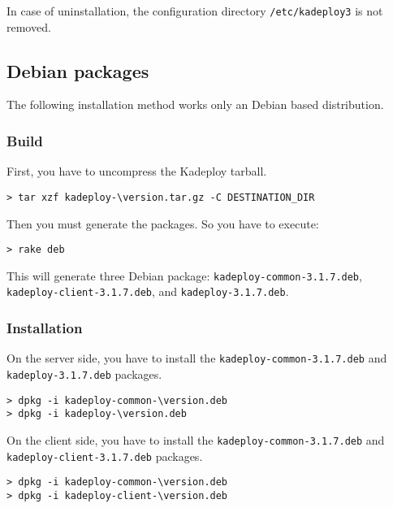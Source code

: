 \documentclass[a4wide,10pt,oneside]{book}
\newcommand{\version}{3.1.7}
\begin{document}
\noindent In case of uninstallation, the configuration directory \texttt{/etc/kadeploy3} is not removed.

\subsection{Debian packages}
The following installation method works only an Debian based distribution.
\subsubsection{Build}
\noindent First, you have to uncompress the Kadeploy tarball.
\begin{small}
\begin{Verbatim}[commandchars=\\\{\}]
> tar xzf kadeploy-\version.tar.gz -C DESTINATION_DIR
\end{Verbatim}
\end{small}

\noindent Then you must generate the packages. So you have to execute:
\begin{small}
\begin{verbatim}
> rake deb
\end{verbatim}
\end{small}
This will generate three Debian package: \texttt{kadeploy-common-\version.deb}, \texttt{kadeploy-client-\version.deb}, and \texttt{kadeploy-\version.deb}.
\subsubsection{Installation}
\noindent On the server side, you have to install the \texttt{kadeploy-common-\version.deb} and \texttt{kadeploy-\version.deb} packages.
\begin{small}
\begin{Verbatim}[commandchars=\\\{\}]
> dpkg -i kadeploy-common-\version.deb
> dpkg -i kadeploy-\version.deb
\end{Verbatim}
\end{small}

\noindent On the client side, you have to install the \texttt{kadeploy-common-\version.deb} and \texttt{kadeploy-client-\version.deb} packages.
\begin{small}
\begin{Verbatim}[commandchars=\\\{\}]
> dpkg -i kadeploy-common-\version.deb
> dpkg -i kadeploy-client-\version.deb
\end{Verbatim}
\end{small}
\end{document}
